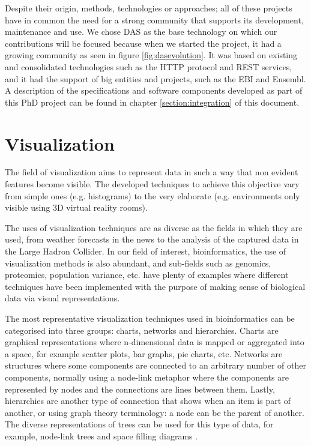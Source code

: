 Despite their origin, methods, technologies or approaches; all of these projects have in common the need for a strong community that supports its development, maintenance and use. We chose DAS as the base technology on which our contributions will be focused because when we started the project, it had a growing community as seen in figure \ref{fig:dasevolution}. It was based on existing and consolidated technologies such as the HTTP protocol and REST services, and it had the support of big entities and projects, such as the EBI and Ensembl. A description of the specifications and software components developed as part of this PhD project can be found in chapter \ref{section:integration} of this document.

\newpage


\section{Visualization}

The field of visualization aims to represent data in such a way that non evident features become visible. The developed techniques to achieve this objective vary from simple ones (e.g. histograms) to the very elaborate (e.g. environments only visible using 3D virtual reality rooms).

The uses of visualization techniques are as diverse as the fields in which they are used, from weather forecasts in the news to the analysis of the captured data in the Large Hadron Collider. In our field of interest, bioinformatics, the use of visualization methods is also abundant, and sub-fields such as genomics, proteomics, population variance, etc. have plenty of examples where different techniques have been implemented with the purpose of making sense of biological data via visual representations.

The most representative visualization techniques used in bioinformatics can be categorised into three groups: charts, networks and hierarchies. Charts are graphical representations where n-dimensional data is mapped or aggregated into a space, for example scatter plots, bar graphs, pie charts, etc. Networks are structures where some components are connected to an arbitrary number of other components, normally using a node-link metaphor where the components are represented by nodes and the connections are lines between them. Lastly, hierarchies are another type of connection that shows when an item is part of another, or using graph theory terminology: a node can be the parent of another. The diverse representations of trees can be used for this type of data, for example, node-link trees and space filling diagrams \cite{WAN2014}. 

